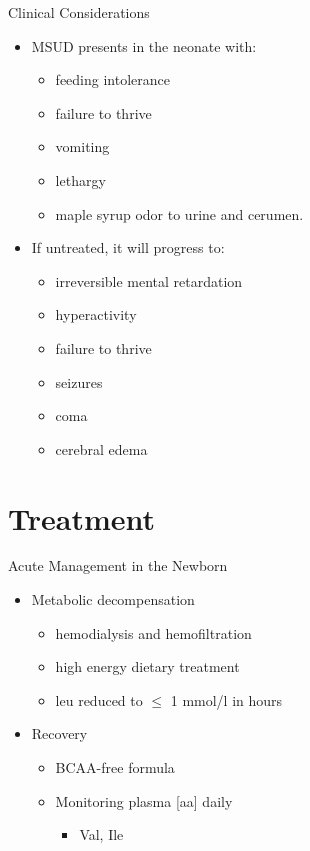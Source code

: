 \documentclass[presentation, smaller]{beamer}
\begin{document}
\begin{frame}[label={sec:orgheadline18}]{Clinical Considerations}
\begin{itemize}
\item MSUD presents in the neonate with:
\begin{itemize}
\item feeding intolerance
\item failure to thrive
\item vomiting
\item lethargy
\item maple syrup odor to urine and cerumen.
\end{itemize}
\item If untreated, it will progress to:
\begin{itemize}
\item irreversible mental retardation
\item hyperactivity
\item failure to thrive
\item seizures
\item coma
\item cerebral edema
\end{itemize}
\end{itemize}
\end{frame}

\section{Treatment}
\label{sec:orgheadline24}
\begin{frame}[label={sec:orgheadline20}]{Acute Management in the Newborn}
\begin{itemize}
\item Metabolic decompensation
\begin{itemize}
\item hemodialysis and hemofiltration
\item high energy dietary treatment
\item leu reduced to \(\le\) 1 mmol/l in hours
\end{itemize}
\item Recovery
\begin{itemize}
\item BCAA-free formula
\item Monitoring plasma [aa] daily
\begin{itemize}
\item Val, Ile
\end{itemize}
\end{itemize}
\end{itemize}
\end{frame}
\end{document}

